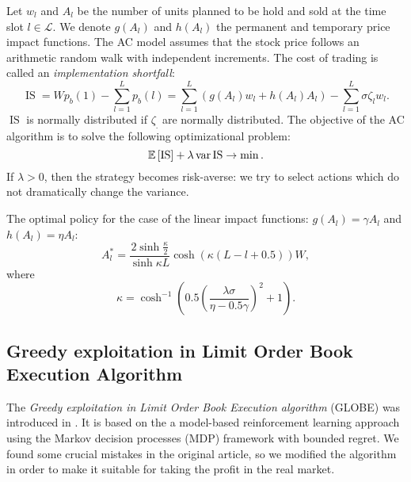         Let $w_l$ and $A_l$ be the number of units planned to be hold and sold at the time slot $l\in\mathcal L$.
        We denote $g(A_l)$ and $h(A_l)$ the permanent and temporary price impact functions.
        The AC model assumes that the stock price follows an arithmetic random walk with independent increments.
        The cost of trading is called an \emph{implementation shortfall}:
        \begin{equation*}
            \operatorname{IS} = Wp_b(1) - \sum_{l=1}^L p_b(l) = \sum_{l=1}^L \left(g(A_l)w_l + h(A_l)A_l\right) - \sum_{l=1}^L \sigma \zeta_lw_l.
        \end{equation*}
        $\operatorname{IS}$ is normally distributed if $\zeta_.$ are normally distributed. The objective of the AC algorithm is to solve the following optimizational problem:
        \begin{equation}\label{equation:ACtarget}
            \mathbb{E}\left[\operatorname{IS}\right] + \lambda \operatorname*{var} \operatorname{IS} \to \min.
        \end{equation}
        If $\lambda > 0$, then the strategy becomes risk-averse: we try to select actions which do not dramatically change the variance.

        The optimal policy for the case of the linear impact functions: $g(A_l) = \gamma A_l$ and $h(A_l) = \eta A_l$:
        \begin{equation*}
            A_l^* = \frac{2\sinh \frac{\kappa}{2}}{\sinh \kappa L}\cosh\left(\kappa (L-l+0.5)\right) W,
        \end{equation*}
        where
        \begin{equation*}
            \kappa = \cosh^{-1}\left(0.5\left(\frac{\lambda\sigma}{\eta - 0.5\gamma}\right)^2 + 1\right).
        \end{equation*}

    \subsection{Greedy exploitation in Limit Order Book Execution Algorithm}
        The \emph{Greedy exploitation in Limit Order Book Execution algorithm} (GLOBE) was introduced in \cite{Akbarzadeh2018}.
        It is based on the a model-based reinforcement learning approach using the Markov decision processes (MDP) framework with bounded regret. We found some crucial mistakes in the original 
        article, so we modified the algorithm in order to make it suitable for taking the profit in the real market.

